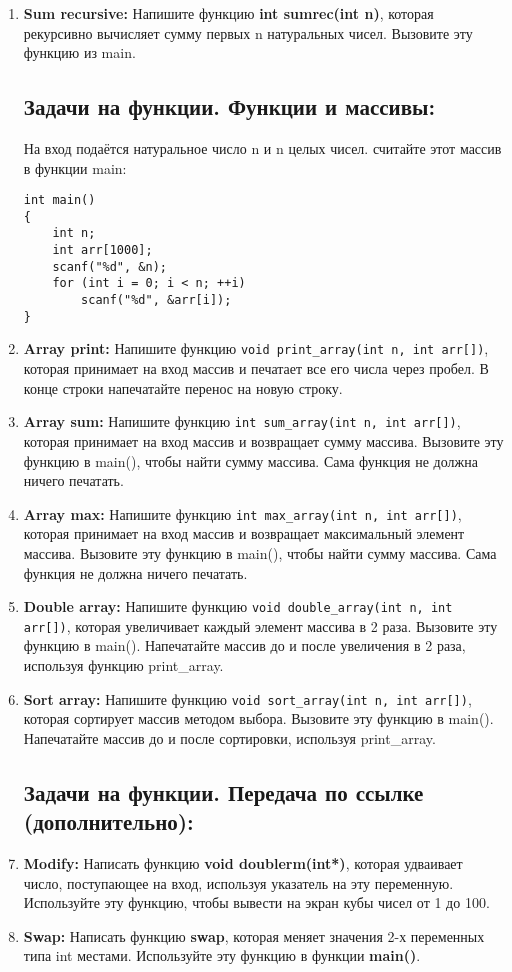 \documentclass{article}
\begin{document}
\begin{enumerate}
\item \textbf{Sum recursive:} Напишите функцию \textbf{int sumrec(int n)}, которая рекурсивно вычисляет сумму первых n натуральных чисел. Вызовите эту функцию из main.


\newpage
\subsection*{Задачи на функции. Функции и массивы:}
На вход подаётся натуральное число n и n целых чисел. считайте этот массив в функции main:
\begin{lstlisting}
int main()
{
	int n;
	int arr[1000];
	scanf("%d", &n);
	for (int i = 0; i < n; ++i)
		scanf("%d", &arr[i]);
}
\end{lstlisting}
\item \textbf{Array print:} Напишите функцию \texttt{void print\_array(int n, int arr[])}, которая принимает на вход массив и печатает все его числа через пробел. В конце строки напечатайте перенос на новую строку.
\item \textbf{Array sum:} Напишите функцию \texttt{int sum\_array(int n, int arr[])}, которая принимает на вход массив и возвращает сумму массива. Вызовите эту функцию в main(), чтобы найти сумму массива. Сама функция не должна ничего печатать.
\item \textbf{Array max:} Напишите функцию \texttt{int max\_array(int n, int arr[])}, которая принимает на вход массив и возвращает максимальный элемент массива. Вызовите эту функцию в main(), чтобы найти сумму массива. Сама функция не должна ничего печатать.
\item \textbf{Double array:} Напишите функцию \texttt{void double\_array(int n, int arr[])}, которая увеличивает каждый элемент массива в 2 раза. Вызовите эту функцию в main(). Напечатайте массив до и после увеличения в 2 раза, используя функцию print\_array.
\item \textbf{Sort array:} Напишите функцию \texttt{void sort\_array(int n, int arr[])}, которая сортирует массив методом выбора. Вызовите эту функцию в main(). Напечатайте массив до и после сортировки, используя print\_array.

\subsection*{Задачи на функции. Передача по ссылке (дополнительно):}
\item \textbf{Modify:} Написать функцию \textbf{void doublerm(int*)}, которая удваивает число, поступающее на вход, используя указатель на эту переменную. Используйте эту функцию, чтобы вывести на экран кубы чисел от 1 до 100.
\item \textbf{Swap:} Написать функцию \textbf{swap}, которая меняет значения 2-х переменных типа int местами. Используйте эту функцию в функции \textbf{main()}.



\end{enumerate}
\end{document}
